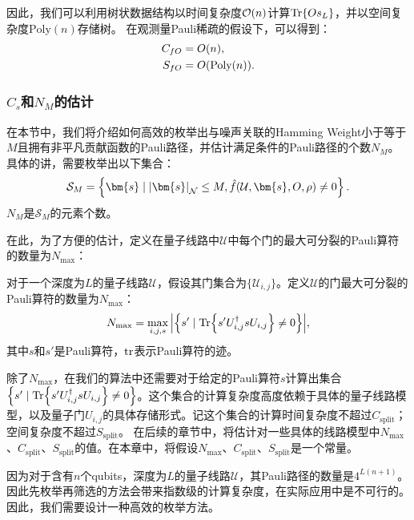 因此，我们可以利用树状数据结构以时间复杂度$\order{n}$计算$\Tr{O s_L}$，并以空间复杂度$\mathrm{Poly}(n)$存储树。
在观测量Pauli稀疏的假设下，可以得到：
\begin{equation}\label{eq:cost_O}
    \begin{aligned}
        C_{fO}&=O(n),\\
        S_{fO}&=O(\text{Poly}(n)).
    \end{aligned}
\end{equation}



\subsubsection{$C_s$和$N_M$的估计}

在本节中，我们将介绍如何高效的枚举出与噪声关联的Hamming Weight小于等于$M$且拥有非平凡贡献函数的Pauli路径，并估计满足条件的Pauli路径的个数$N_M$。具体的讲，需要枚举出以下集合：
\begin{equation}
    \mathcal{S}_M = \left\{ \bm{s} \mid \abs{\bm{s}}_{\mathcal{N}}\leq M, \hat{f}(\mathcal{U},\bm{s},O,\rho)\neq 0 \right\}.
\end{equation}
$N_M$是$\mathcal{S}_M$的元素个数。


在此，为了方便的估计，定义在量子线路中$\mathcal{U}$中每个门的最大可分裂的Pauli算符的数量为$N_{\text{max}}$：
\begin{definition}
    对于一个深度为$L$的量子线路$\mathcal{U}$，假设其门集合为$\{\mathcal{U}_{i,j}\}$。定义$\mathcal{U}$的门最大可分裂的Pauli算符的数量为$N_{\text{max}}$：
    \begin{equation}
        N_{\text{max}} = \max_{i,j,s}\abs{ \left\{ s'\mid \Tr{s' U^\dagger_{i,j}s U_{i,j}}\neq 0 \right\}},
    \end{equation}
    其中$s$和$s'$是Pauli算符，$\tr$表示Pauli算符的迹。 
\end{definition}
除了$N_{\text{max}}$，在我们的算法中还需要对于给定的Pauli算符$s$计算出集合$\left\{ s'\mid \Tr{s' U^\dagger_{i,j}s U_{i,j}}\neq 0 \right\}$。这个集合的计算复杂度高度依赖于具体的量子线路模型，以及量子门$U_{i,j}$的具体存储形式。记这个集合的计算时间复杂度不超过$C_{\text{split}}$；空间复杂度不超过$S_{\text{split}}$。
在后续的章节中，将估计对一些具体的线路模型中$N_{\text{max}}$、$C_{\text{split}}$、$S_{\text{split}}$的值。在本章中，将假设$N_{\text{max}}$、$C_{\text{split}}$、$S_{\text{split}}$是一个常量。

因为对于含有$n$个qubits，深度为$L$的量子线路$\mathcal{U}$，其Pauli路径的数量是$4^{L(n+1)}$。因此先枚举再筛选的方法会带来指数级的计算复杂度，在实际应用中是不可行的。因此，我们需要设计一种高效的枚举方法。

